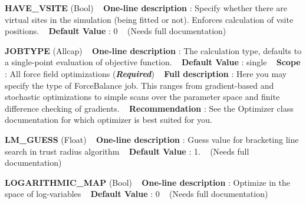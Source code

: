 \begin{DoxyItemize}
\item {\bfseries  H\+A\+V\+E\+\_\+\+V\+S\+I\+TE } (Bool) ~\newline
{\bfseries  One-\/line description }\+: Specify whether there are virtual sites in the simulation (being fitted or not). Enforces calculation of vsite positions. ~\newline
{\bfseries  Default Value }\+: 0 ~\newline
(Needs full documentation)\end{DoxyItemize}
\begin{DoxyItemize}
\item {\bfseries  J\+O\+B\+T\+Y\+PE } (Allcap) ~\newline
{\bfseries  One-\/line description }\+: The calculation type, defaults to a single-\/point evaluation of objective function. ~\newline
{\bfseries  Default Value }\+: single ~\newline
{\bfseries  Scope }\+: All force field optimizations ({\bfseries {\itshape Required}}) ~\newline
{\bfseries  Full description }\+: Here you may specify the type of Force\+Balance job. This ranges from gradient-\/based and stochastic optimizations to simple scans over the parameter space and finite difference checking of gradients. ~\newline
{\bfseries  Recommendation }\+: See the Optimizer class documentation for which optimizer is best suited for you.\end{DoxyItemize}
\begin{DoxyItemize}
\item {\bfseries  L\+M\+\_\+\+G\+U\+E\+SS } (Float) ~\newline
{\bfseries  One-\/line description }\+: Guess value for bracketing line search in trust radius algorithm ~\newline
{\bfseries  Default Value }\+: 1. ~\newline
(Needs full documentation)\end{DoxyItemize}
\begin{DoxyItemize}
\item {\bfseries  L\+O\+G\+A\+R\+I\+T\+H\+M\+I\+C\+\_\+\+M\+AP } (Bool) ~\newline
{\bfseries  One-\/line description }\+: Optimize in the space of log-\/variables ~\newline
{\bfseries  Default Value }\+: 0 ~\newline
(Needs full documentation)\end{DoxyItemize}
